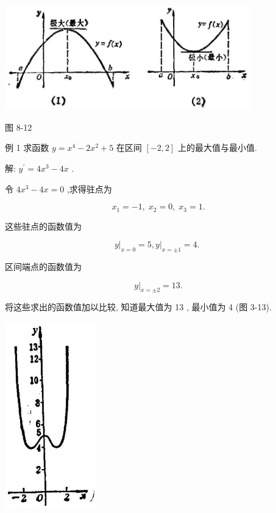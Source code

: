 \documentclass[lang=cn,newtx,10pt,scheme=chinese]{elegantbook}
\begin{document}
\begin{center}
\includegraphics[max width=0.8\textwidth]{images/01912c18-5c3f-733d-b775-749ba9897a9d_147_605988.jpg}
\end{center}

图 8-12

例 1 求函数 \(y = {x}^{4} - 2{x}^{2} + 5\) 在区间 \(\left\lbrack {-2,2}\right\rbrack\) 上的最大值与最小值.

解: \({y}^{\prime } = 4{x}^{3} - {4x}\) .

令 \(4{x}^{3} - {4x} = 0\) ,求得驻点为

\[
{x}_{1} = - 1,\;{x}_{2} = 0,\;{x}_{3} = 1.
\]

这些驻点的函数值为

\[
{\left. y\right| }_{x = 0} = 5,{\left. y\right| }_{x = \pm 1} = 4\text{. }
\]

区间端点的函数值为

\[
{\left. y\right| }_{x = \pm 2} = {13}\text{.}
\]

将这些求出的函数值加以比较, 知道最大值为 13 , 最小值为 4 (图 3-13).

\begin{center}
\includegraphics[max width=0.3\textwidth]{images/01912c18-5c3f-733d-b775-749ba9897a9d_148_436471.jpg}
\end{center}
\end{document}
